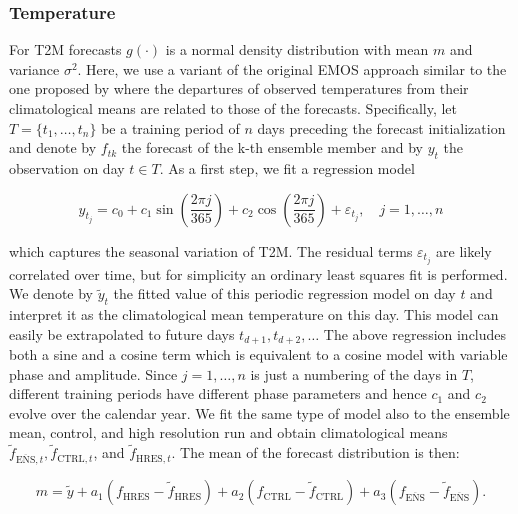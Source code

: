 \subsubsection{Temperature}
For T2M forecasts $g(\cdot)$ is a normal density distribution with
mean $m$ and variance $\sigma^{2}$. Here, we use a variant of the
original EMOS approach similar to the one proposed by
\citet{ScheueBue13} where the departures of observed temperatures from
their climatological means are related to those of the forecasts.
Specifically, let $T=\{t_{1},\ldots,t_{n}\}$ be a training period of
$n$ days preceding the forecast initialization and denote by $f_{tk}$
the forecast of the k-th ensemble member and by $y_{t}$ the
observation on day $t\in T$. As a first step, we fit a regression
model
\begin{linenomath*}
\begin{equation}
y_{t_{j}} = c_{0} + c_{1}\sin\left(\frac{2\pi j}{365}\right) +
c_{2}\cos\left(\frac{2\pi j}{365}\right) + \varepsilon_{t_{j}}, \quad
j=1,\ldots,n
\end{equation}
\end{linenomath*}
which captures the seasonal variation of T2M. The residual terms
$\varepsilon_{t_{j}}$ are likely correlated over time, but for
simplicity an ordinary least squares fit is performed. We denote by
$\tilde{y}_{t}$ the fitted value of this periodic regression model on
day $t$ and interpret it as the climatological mean temperature on
this day. This model can easily be extrapolated to future days
$t_{d+1}, t_{d+2}, \ldots$ The above regression includes both a sine
and a cosine term which is equivalent to a cosine model with variable
phase and amplitude. Since $j=1,\ldots,n$ is just a numbering of the
days in $T$, different training periods have different phase
parameters and hence $c_{1}$ and $c_{2}$ evolve over the calendar
year. We fit the same type of model also to the ensemble mean,
control, and high resolution run and obtain climatological means
$\tilde{f}_{\overline{\mathrm{ENS}},t}, \tilde{f}_{\mathrm{CTRL},t}$,
and $\tilde{f}_{\mathrm{HRES},t}$. The mean of the forecast
distribution is then:
\begin{linenomath*}
\begin{equation}
m = \tilde{y} + a_{1}(f_{\mathrm{HRES}} - \tilde{f}_{\mathrm{HRES}}) +
a_{2}(f_{\mathrm{CTRL}} - \tilde{f}_{\mathrm{CTRL}}) +
a_{3}(f_{\overline{\mathrm{ENS}}} -
\tilde{f}_{\overline{\mathrm{ENS}}}).
\end{equation}
\end{linenomath*}
